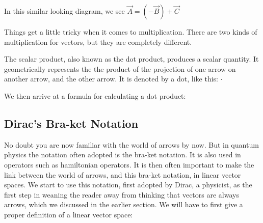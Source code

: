 In this similar looking diagram, we see $\vec{A} = \left(-\vec{B}\right) + \vec{C}$

Things get a little tricky when it comes to multiplication. There are two kinds of multiplication for vectors, but they are completely different.

The scalar product, also known as the dot product, produces a scalar quantity. It geometrically represents the the product of the projection of one arrow on another arrow, and the other arrow. It is denoted by a dot, like this: $\cdot$

We then arrive at a formula for calculating a dot product:
\begin{defi}\label{dotprod}
\end{defi}


\subsection{Dirac's Bra-ket Notation}
No doubt you are now familiar with the world of arrows by now. But in quantum physics the notation often adopted is the bra-ket notation. It is also used in operators such as hamiltonian operators. It is then often important to make the link between the world of arrows, and this bra-ket notation, in linear vector spaces. We start to use this notation, first adopted by Dirac, a physicist, as the first step in weaning the reader away from thinking that vectors are always arrows, which we discussed in the earlier section. We will have to first give a proper definition of a linear vector space:

